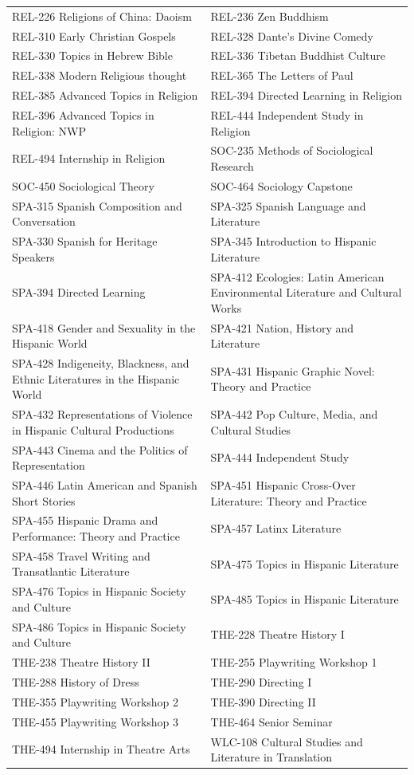 \documentclass[
  letterpaper,
]{scrbook}
\begin{document}
{\begin{longtable}[]{@{}
  >{\raggedright\arraybackslash}p{}
  >{\raggedright\arraybackslash}p{}@{}}
REL-226 Religions of China: Daoism & REL-236 Zen Buddhism \\
REL-310 Early Christian Gospels & REL-328 Dante's Divine Comedy \\
REL-330 Topics in Hebrew Bible & REL-336 Tibetan Buddhist Culture \\
REL-338 Modern Religious thought & REL-365 The Letters of Paul \\
REL-385 Advanced Topics in Religion & REL-394 Directed Learning in
Religion \\
REL-396 Advanced Topics in Religion: NWP & REL-444 Independent Study in
Religion \\
REL-494 Internship in Religion & SOC-235 Methods of Sociological
Research \\
SOC-450 Sociological Theory & SOC-464 Sociology Capstone \\
SPA-315 Spanish Composition and Conversation & SPA-325 Spanish Language
and Literature \\
SPA-330 Spanish for Heritage Speakers & SPA-345 Introduction to Hispanic
Literature \\
SPA-394 Directed Learning & SPA-412 Ecologies: Latin American
Environmental Literature and Cultural Works \\
SPA-418 Gender and Sexuality in the Hispanic World & SPA-421 Nation,
History and Literature \\
SPA-428 Indigeneity, Blackness, and Ethnic Literatures in the Hispanic
World & SPA-431 Hispanic Graphic Novel: Theory and Practice \\
SPA-432 Representations of Violence in Hispanic Cultural Productions &
SPA-442 Pop Culture, Media, and Cultural Studies \\
SPA-443 Cinema and the Politics of Representation & SPA-444 Independent
Study \\
SPA-446 Latin American and Spanish Short Stories & SPA-451 Hispanic
Cross-Over Literature: Theory and Practice \\
SPA-455 Hispanic Drama and Performance: Theory and Practice & SPA-457
Latinx Literature \\
SPA-458 Travel Writing and Transatlantic Literature & SPA-475 Topics in
Hispanic Literature \\
SPA-476 Topics in Hispanic Society and Culture & SPA-485 Topics in
Hispanic Literature \\
SPA-486 Topics in Hispanic Society and Culture & THE-228 Theatre History
I \\
THE-238 Theatre History II & THE-255 Playwriting Workshop 1 \\
THE-288 History of Dress & THE-290 Directing I \\
THE-355 Playwriting Workshop 2 & THE-390 Directing II \\
THE-455 Playwriting Workshop 3 & THE-464 Senior Seminar \\
THE-494 Internship in Theatre Arts & WLC-108 Cultural Studies and
Literature in Translation \\
\end{longtable}
}
\end{document}
